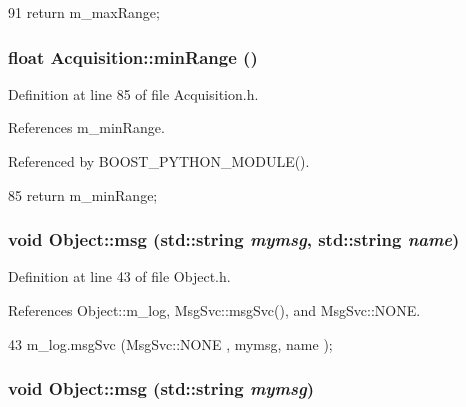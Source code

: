 \begin{DoxyCode}
91 {return m_maxRange;}
\end{DoxyCode}
\hypertarget{classAcquisition_a44f441710231748d2ca8f691647b2bcd}{
\subsubsection[{minRange}]{\setlength{\rightskip}{0pt plus 5cm}float Acquisition::minRange ()}}
\label{classAcquisition_a44f441710231748d2ca8f691647b2bcd}


Definition at line 85 of file Acquisition.h.

References m\_\-minRange.

Referenced by BOOST\_\-PYTHON\_\-MODULE().


\begin{DoxyCode}
85 {return m_minRange;}
\end{DoxyCode}
\hypertarget{classObject_ac5d59299273cee27aacf7de00d2e7034}{
\subsubsection[{msg}]{\setlength{\rightskip}{0pt plus 5cm}void Object::msg (std::string {\em mymsg}, \/  std::string {\em name})}}
\label{classObject_ac5d59299273cee27aacf7de00d2e7034}


Definition at line 43 of file Object.h.

References Object::m\_\-log, MsgSvc::msgSvc(), and MsgSvc::NONE.


\begin{DoxyCode}
43 { m_log.msgSvc (MsgSvc::NONE    , mymsg, name ); }
\end{DoxyCode}
\hypertarget{classObject_a58b2d0618c2d08cf2383012611528d97}{
\subsubsection[{msg}]{\setlength{\rightskip}{0pt plus 5cm}void Object::msg (std::string {\em mymsg})}}
\label{classObject_a58b2d0618c2d08cf2383012611528d97}


